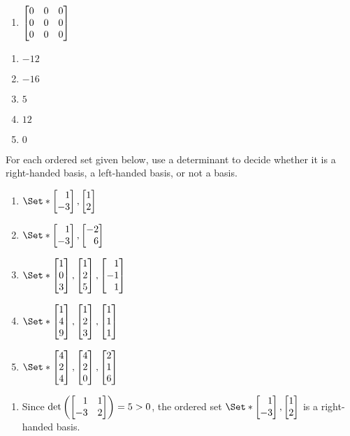 \begin{exercises}
\begin{problist}
\begin{enumerate}
			\item $\mat{0 & 0 & 0 \\ 0 & 0 & 0 \\ 0 & 0 & 0}$
		\end{enumerate}
		\begin{solution}
			\begin{enumerate}
				\item $-12$

				\item $-16$

				\item $5$

				\item $12$

				\item $0$
			\end{enumerate}
		\end{solution}

		\prob For each ordered set given below, use a determinant to decide whether
		it is a right-handed basis, a left-handed basis, or not a basis.
		\begin{enumerate}
			\item $\Set*{\mat{1 \\ -3},\mat{1 \\ 2}}$

			\item $\Set*{\mat{1 \\ -3},\mat{-2 \\ 6}}$

			\item $\Set*{\mat{1 \\ 0 \\ 3},\mat{1 \\ 2 \\ 5},\mat{1 \\ -1 \\ 1}}$

			\item $\Set*{\mat{1 \\ 4 \\ 9},\mat{1 \\ 2 \\ 3},\mat{1 \\ 1 \\ 1}}$

			\item $\Set*{\mat{4 \\ 2 \\ 4},\mat{4 \\ 2 \\ 0},\mat{2 \\ 1 \\ 6}}$
		\end{enumerate}
		\begin{solution}
			\begin{enumerate}
				\item Since $\det\left(\mat{1 & 1 \\ -3 & 2}\right)=5>0$, the ordered set
					$\Set*{\mat{1 \\ -3},\mat{1 \\ 2}}$ is a right-handed basis.


\end{enumerate}
\end{solution}
\end{problist}
\end{exercises}

